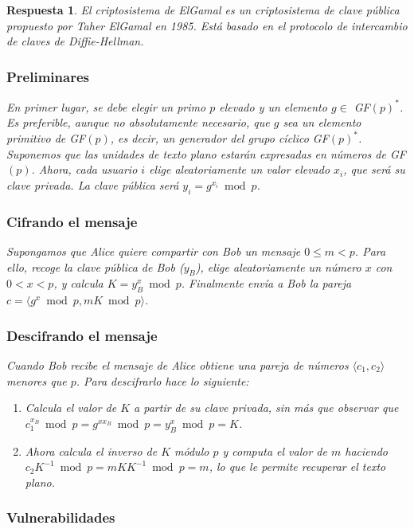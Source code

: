 \documentclass[
  a4paper,
  spanish,
  12pt,
]{scrartcl}
\theoremstyle{ejercicio-style}
\theoremstyle{remark-style}
\newtheorem*{sol}{Respuesta}
\theoremstyle{teorema-style}
\begin{document}
\begin{sol}
El criptosistema de ElGamal es un criptosistema de clave pública propuesto por Taher ElGamal en 1985. Está basado en el protocolo de intercambio de claves de Diffie-Hellman.

\subsubsection*{Preliminares}

En primer lugar, se debe elegir un primo $p$ elevado y un elemento  $g \in$ GF$(p)^\ast$. Es preferible, aunque no absolutamente necesario, que $g$ sea un elemento primitivo de GF$(p)$, es decir, un generador del grupo cíclico GF$(p)^\ast$. Suponemos que las unidades de texto plano estarán expresadas en números de GF$(p)$. Ahora, cada usuario $i$ elige aleatoriamente un valor elevado $x_i$, que será su clave privada. La clave pública será $y_i = g^{x_i} \bmod p$.

\subsubsection*{Cifrando el mensaje}

Supongamos que Alice quiere compartir con Bob un mensaje \(0\leq m < p\). Para ello, recoge la clave pública de Bob ($y_B$), elige aleatoriamente un número $x$ con $0 < x < p$, y calcula $K = y_B ^{x} \bmod p$. Finalmente envía a Bob la pareja \(c = \langle g^{x} \bmod{p}, mK \bmod p\rangle\).

\subsubsection*{Descifrando el mensaje}

Cuando Bob recibe el mensaje de Alice obtiene una pareja de números $\langle c_1, c_2 \rangle$ menores que $p$. Para descifrarlo hace lo siguiente:

\begin{enumerate}
  \item Calcula el valor de $K$ a partir de su clave privada, sin más que observar que $c_1^{x_B}  \bmod p = g^{xx_B} \bmod p = y_B^{x} \bmod p = K$.
  \item Ahora calcula el inverso de $K$ módulo $p$ y computa el valor de $m$ haciendo $c_2K^{-1} \bmod p = mKK^{-1} \bmod p = m$, lo que le permite recuperar el texto plano.
\end{enumerate}

\subsubsection*{Vulnerabilidades}


\end{sol}
\end{document}
